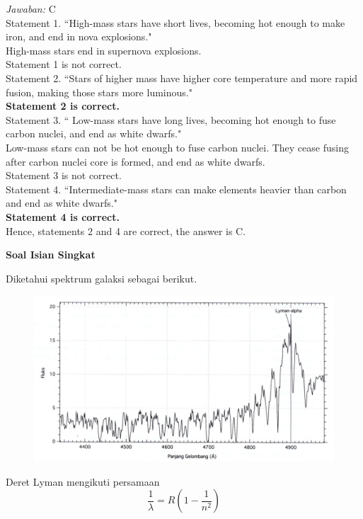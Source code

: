 \documentclass[11pt,fleqn]{exam}
\begin{document}
\begin{questions}
\textit{Jawaban: }C\\
Statement 1. ``High-mass stars have short lives, becoming hot enough to make iron, and end in nova explosions."\\
High-mass stars end in supernova explosions.\\
Statement 1 is not correct.\\
Statement 2. ``Stars of higher mass have higher core temperature and more rapid fusion, making those stars more luminous."\\
\textbf{Statement 2 is correct.}\\
Statement 3. `` Low-mass stars have long lives, becoming hot enough to fuse carbon nuclei, and end as white dwarfs."\\
Low-mass stars can not be hot enough to fuse carbon nuclei. They cease fusing after carbon nuclei core is formed, and end as white dwarfs.\\
Statement 3 is not correct.\\
Statement 4. ``Intermediate-mass stars can make elements heavier than carbon and end as white dwarfs."\\
\textbf{Statement 4 is correct.}\\
Hence, statements 2 and 4 are correct, the answer is C.


\vspace{0.5cm}
\textbf{Soal Isian Singkat}

\question Diketahui spektrum galaksi sebagai berikut.
\begin{figure}[h!]
\centering
\includegraphics[scale=1]{lymanbreak.png}
\end{figure}

Deret Lyman mengikuti persamaan
\begin{equation*}
\frac{1}{\lambda}=R(1-\frac{1}{n^2})
\end{equation*}


\end{questions}
\end{document}
